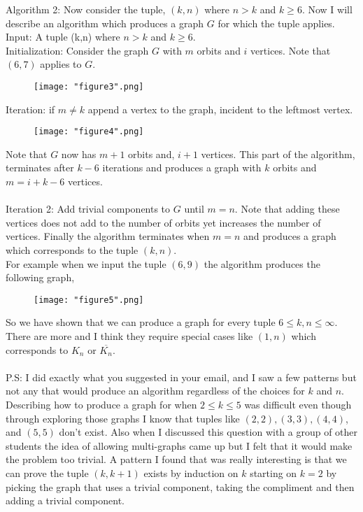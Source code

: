 \documentclass{amsart}
\begin{document}
\begin{enumerate}
Algorithm 2:
Now consider the tuple, $(k,n)$ where $n > k$ and $k \geq 6$. Now I will describe an algorithm which produces a graph $G$ for which the tuple applies.\\
Input: A tuple (k,n) where  $n > k$ and $k \geq 6$.\\
Initialization: Consider the graph $G$ with $m$ orbits and $i$ vertices. Note that $(6,7)$ applies to $G$.
\begin{figure}[H]
\caption{}
\centering
\texttt{[image: "figure3".png]}
\end{figure}
Iteration: if $m \neq k$ append a vertex to the graph, incident to the leftmost vertex.
\begin{figure}[H]
\caption{}
\centering
\texttt{[image: "figure4".png]}
\end{figure}
Note that $G$ now has $m+1$ orbits and, $i+1$ vertices. This part of the algorithm, terminates after $k-6$ iterations and produces a graph with $k$ orbits and $m = i+k-6$ vertices. \\\\
Iteration 2: Add trivial components to $G$ until $m = n$. Note that adding these vertices does not add to the number of orbits yet increases the number of vertices. Finally the algorithm terminates when $m = n$ and produces a graph which corresponds to the tuple $(k,n)$.\\
For example when we input the tuple $(6,9)$ the algorithm produces the following graph,
\begin{figure}[H]
\caption{}
\centering
\texttt{[image: "figure5".png]}
\end{figure}
So we have shown that we can produce a graph for every tuple $6\leq k,n \leq \infty$. There are more and I think they require special cases like $(1, n)$ which corresponds to $K_n$ or $\overline{K_n}$.
\\\\
P.S: I did exactly what you suggested in your email, and I saw a few patterns but not any that would produce an algorithm regardless of the choices for $k$ and $n$. Describing how to produce a graph for when $2 \leq k \leq 5$ was difficult even though through exploring those graphs I know that tuples like $(2,2),(3,3),(4,4)$, and $(5,5)$ don't exist. Also when I discussed this question with a group of other students the idea of allowing multi-graphs came up but I felt that it would make the problem too trivial. A pattern I found that was really interesting is that we can prove the tuple $(k,k+1)$ exists by induction on $k$ starting on $k = 2$ by picking the graph that uses a trivial component, taking the compliment and then adding a trivial component. 









\end{enumerate}
\end{document}
